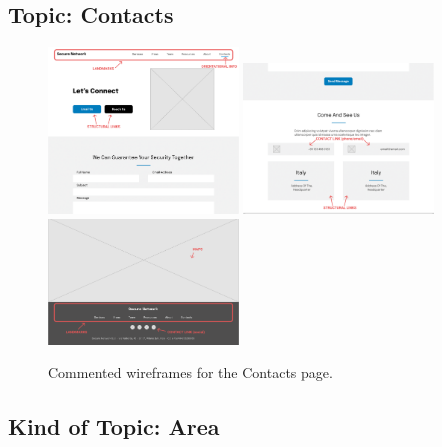 \documentclass[12pt]{report}
\begin{document}
\subsection{Topic: Contacts}

\begin{figure}[H]
	\centering
	\includegraphics[width=0.45\textwidth]{low_fid_wireframes/contacts/1.png}
	\includegraphics[width=0.45\textwidth]{low_fid_wireframes/contacts/2.png}
	\includegraphics[width=0.45\textwidth]{low_fid_wireframes/contacts/3.png}
	\caption{Commented wireframes for the Contacts page.}
\end{figure}

\subsection{Kind of Topic: Area}
\end{document}
